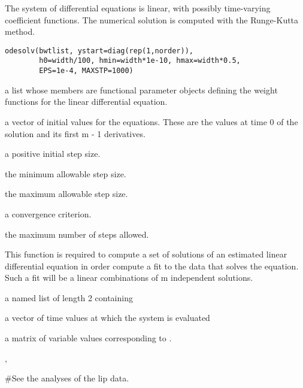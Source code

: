 \begin{Description}\relax
The system of differential equations is linear, with
possibly time-varying coefficient functions.
The numerical solution is computed with the Runge-Kutta method.
\end{Description}
\begin{Usage}
\begin{verbatim}
odesolv(bwtlist, ystart=diag(rep(1,norder)),
        h0=width/100, hmin=width*1e-10, hmax=width*0.5,
        EPS=1e-4, MAXSTP=1000)
\end{verbatim}
\end{Usage}
\begin{Arguments}
\begin{ldescription}
\item[\code{bwtlist}] a list whose members are functional parameter objects
defining the weight functions for the linear differential
equation.

\item[\code{ystart}] a vector of initial values for the equations.  These
are the values at time 0 of the solution and its first
m - 1 derivatives.

\item[\code{h0}] a positive initial step size.

\item[\code{hmin}] the minimum allowable step size.

\item[\code{hmax}] the maximum allowable step size.

\item[\code{EPS}] a convergence criterion.

\item[\code{MAXSTP}] the maximum number of steps allowed.

\end{ldescription}
\end{Arguments}
\begin{Details}\relax
This function is required to compute a set of solutions of an
estimated linear differential equation in order compute a fit
to the data that solves the equation.  Such a fit will be a
linear combinations of m independent solutions.
\end{Details}
\begin{Value}
a named list of length 2 containing

\begin{ldescription}
\item[\code{tp}] a vector of time values at which the system is evaluated

\item[\code{yp}] a matrix of variable values corresponding to .

\end{ldescription}
\end{Value}
\begin{SeeAlso}\relax
{},
\end{SeeAlso}
\begin{Examples}
\begin{ExampleCode}
#See the analyses of the lip data.
\end{ExampleCode}
\end{Examples}

